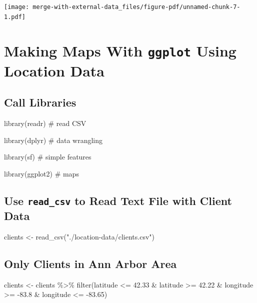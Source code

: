 \documentclass[
  letterpaper,
  DIV=11,
  numbers=noendperiod,
  oneside]{scrreprt}
\newenvironment{Shaded}{\begin{snugshade}}{\end{snugshade}}
\newcommand{\CommentTok}[1]{\textcolor[rgb]{0.37,0.37,0.37}{#1}}
\newcommand{\FloatTok}[1]{\textcolor[rgb]{0.68,0.00,0.00}{#1}}
\newcommand{\FunctionTok}[1]{\textcolor[rgb]{0.28,0.35,0.67}{#1}}
\newcommand{\NormalTok}[1]{\textcolor[rgb]{0.00,0.23,0.31}{#1}}
\newcommand{\OtherTok}[1]{\textcolor[rgb]{0.00,0.23,0.31}{#1}}
\newcommand{\SpecialCharTok}[1]{\textcolor[rgb]{0.37,0.37,0.37}{#1}}
\newcommand{\StringTok}[1]{\textcolor[rgb]{0.13,0.47,0.30}{#1}}
\begin{document}
\texttt{[image: merge-with-external-data\_files/figure-pdf/unnamed-chunk-7-1.pdf]}

\chapter{\texorpdfstring{Making Maps With \texttt{ggplot} Using Location
Data}{Making Maps With ggplot Using Location Data}}\label{sec-location-data}

\section{Call Libraries}\label{call-libraries-5}

\begin{Shaded}
\begin{Highlighting}[]
\FunctionTok{library}\NormalTok{(readr) }\CommentTok{\# read CSV}

\FunctionTok{library}\NormalTok{(dplyr) }\CommentTok{\# data wrangling}

\FunctionTok{library}\NormalTok{(sf) }\CommentTok{\# simple features}

\FunctionTok{library}\NormalTok{(ggplot2) }\CommentTok{\# maps}
\end{Highlighting}
\end{Shaded}

\section{\texorpdfstring{Use \texttt{read\_csv} to Read Text File with
Client
Data}{Use read\_csv to Read Text File with Client Data}}\label{use-read_csv-to-read-text-file-with-client-data}

\begin{Shaded}
\begin{Highlighting}[]
\NormalTok{clients }\OtherTok{\textless{}{-}} \FunctionTok{read\_csv}\NormalTok{(}\StringTok{"./location{-}data/clients.csv"}\NormalTok{)}
\end{Highlighting}
\end{Shaded}

\section{Only Clients in Ann Arbor
Area}\label{only-clients-in-ann-arbor-area}

\begin{Shaded}
\begin{Highlighting}[]
\NormalTok{clients }\OtherTok{\textless{}{-}}\NormalTok{ clients }\SpecialCharTok{\%\textgreater{}\%} 
  \FunctionTok{filter}\NormalTok{(latitude }\SpecialCharTok{\textless{}=} \FloatTok{42.33} \SpecialCharTok{\&}
\NormalTok{           latitude }\SpecialCharTok{\textgreater{}=} \FloatTok{42.22} \SpecialCharTok{\&}
\NormalTok{           longitude }\SpecialCharTok{\textgreater{}=} \SpecialCharTok{{-}}\FloatTok{83.8} \SpecialCharTok{\&}
\NormalTok{           longitude }\SpecialCharTok{\textless{}=} \SpecialCharTok{{-}}\FloatTok{83.65}\NormalTok{)}
\end{Highlighting}
\end{Shaded}
\end{document}
